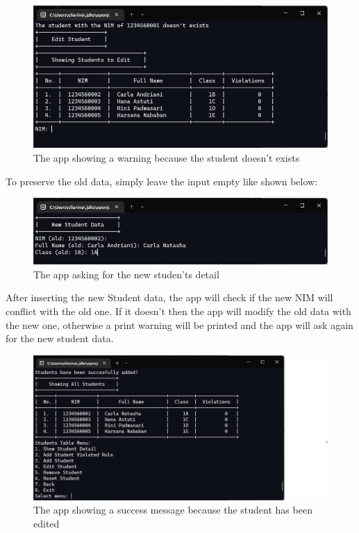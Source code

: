 \documentclass[12pt,titlepage]{article}
\begin{document}
\begin{figure}[h]
    \centering
    \includegraphics[width=.8\textwidth]{images/edit-student-warning.png}
    \caption{The app showing a warning because the student doesn't exists}
\end{figure}

To preserve the old data, simply leave the input empty like shown below:

\begin{figure}[h]
    \centering
    \includegraphics[width=.8\textwidth]{images/edit-student-input.png}
    \caption{The app asking for the new studen'ts detail}
\end{figure}

\pagebreak

After inserting the new Student data, the app will check if the new NIM will conflict with the old one.
If it doesn't then the app will modify the old data with the new one, otherwise a print warning will be printed
and the app will ask again for the new student data.

\begin{figure}[h]
    \centering
    \includegraphics[width=.8\textwidth]{images/edit-student-success.png}
    \caption{The app showing a success message because the student has been edited}
\end{figure}
\end{document}
